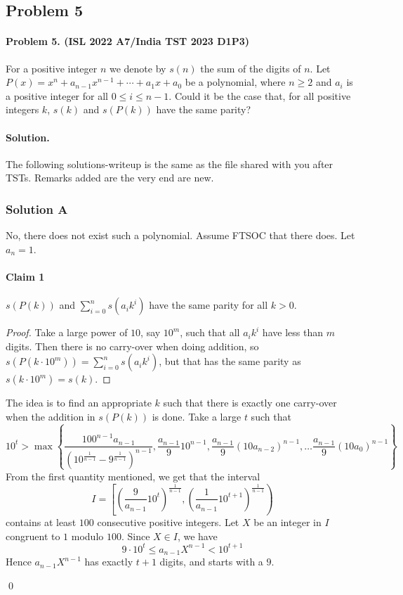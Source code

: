 \documentclass[12pt]{article}
\newenvironment{solution}
{\paragraph{Solution.}}
{\qed\eject}
\newcommand{\hyt}[2]{\hypertarget{#1 Claim #2}{\paragraph{Claim #2}}}
\begin{document}
\subsection*{Problem 5}
\paragraph*{\textbf{Problem 5. (ISL 2022 A7/India TST 2023 D1P3)}} For a positive integer $n$ we denote by $s(n)$ the sum of the digits of $n$. Let $P(x)=x^n+a_{n-1}x^{n-1}+\cdots+a_1x+a_0$ be a polynomial, where $n \geqslant 2$ and $a_i$ is a positive integer for all $0 \leqslant i \leqslant n-1$. Could it be the case that, for all positive integers $k$, $s(k)$ and $s(P(k))$ have the same parity?

\begin{solution}
    The following solutions-writeup is the same as the file shared with you after TSTs. Remarks added are the very end are new.
    

\subsubsection*{Solution A} \label{Solution A}
No, there does not exist such a polynomial. Assume FTSOC that there does. Let $a_n=1$.

\hyt{A}{1} $s(P(k))$ and $\sum\limits_{i=0}^n s(a_i k^i)$ have the same parity for all $k>0$. \\
\begin{proof} Take a large power of $10$, say $10^m$, such that all $a_i k^i$ have less than $m$ digits. Then there is no carry-over when doing addition, so $s(P(k \cdot 10^m))=\sum\limits_{i=0}^n s(a_i k^i)$, but that has the same parity as $s(k \cdot 10^m)=s(k)$.
\end{proof}

The idea is to find an appropriate $k$ such that there is exactly one carry-over when the addition in $s(P(k))$ is done. Take a large $t$ such that
$$10^t > \max \left \{\frac{100^{n-1}a_{n-1}}{(10^{\frac{1}{n-1}}-9^{\frac{1}{n-1}})^{n-1}}, \frac{a_{n-1}}{9}10^{n-1}, \frac{a_{n-1}}{9}(10a_{n-2})^{n-1}, \dots \frac{a_{n-1}}{9}(10a_0)^{n-1} \right \}$$
From the first quantity mentioned, we get that the interval
$$I=\left [ \left(\frac{9}{a_{n-1}}10^t \right)^{\frac{1}{n-1}},\left(\frac{1}{a_{n-1}}10^{t+1} \right)^{\frac{1}{n-1}} \right )$$
contains at least $100$ consecutive positive integers. Let $X$ be an integer in $I$ congruent to $1$ modulo $100$. Since $X \in I$, we have $$9 \cdot 10^t \leq a_{n-1}X^{n-1} < 10^{t+1}$$
Hence $a_{n-1}X^{n-1}$ has exactly $t+1$ digits, and starts with a $9$.


\end{solution}
\end{document}
